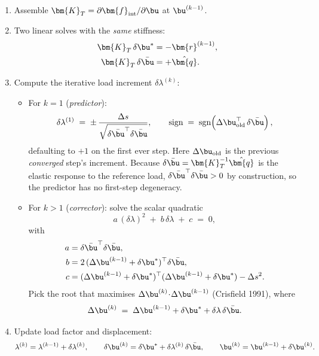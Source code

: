 \begin{enumerate}
\item Assemble $\bm{K}_T = \partial \bm{f}_{\rm int}/\partial \bu$ at $\bu^{(k-1)}$.

\item Two linear solves with the \emph{same} stiffness:
\begin{align}
\bm{K}_T\,\delta\bu^{*} &= -\bm{r}^{(k-1)}, \\
\bm{K}_T\,\delta\bar{\bu} &= +\hat{\bm{q}}.
\end{align}

\item Compute the iterative load increment $\delta\lambda^{(k)}$:
\begin{itemize}
\item For $k=1$ (\emph{predictor}):
\begin{equation}
\delta\lambda^{(1)} \;=\; \pm\,\frac{\Delta s}{\sqrt{\delta\bar{\bu}^{\top}\delta\bar{\bu}}},
\qquad
\text{sign} \;=\; \mathrm{sgn}\!\left(\Delta\bu_{\rm old}^{\top}\,\delta\bar{\bu}\right),
\end{equation}
defaulting to $+1$ on the first ever step. Here $\Delta\bu_{\rm old}$
is the previous \emph{converged} step's increment. Because
$\delta\bar{\bu} = \bm{K}_T^{-1}\hat{\bm{q}}$ is the elastic response to
the reference load, $\delta\bar{\bu}^{\top}\delta\bar{\bu} > 0$ by
construction, so the predictor has no first-step degeneracy.

\item For $k>1$ (\emph{corrector}): solve the scalar quadratic
\begin{equation}
a\,(\delta\lambda)^2 \;+\; b\,\delta\lambda \;+\; c \;=\; 0,
\end{equation}
with
\begin{align}
a &= \delta\bar{\bu}^{\top}\delta\bar{\bu}, \\
b &= 2\,(\Delta\bu^{(k-1)} + \delta\bu^{*})^{\top}\delta\bar{\bu}, \\
c &= (\Delta\bu^{(k-1)} + \delta\bu^{*})^{\top}(\Delta\bu^{(k-1)} + \delta\bu^{*}) - \Delta s^2.
\end{align}
Pick the root that maximises $\Delta\bu^{(k)}\!\cdot\!\Delta\bu^{(k-1)}$
(Crisfield 1991), where
\begin{equation}
\Delta\bu^{(k)} \;=\; \Delta\bu^{(k-1)} + \delta\bu^{*} + \delta\lambda\,\delta\bar{\bu}.
\end{equation}
\end{itemize}

\item Update load factor and displacement:
\begin{equation}
\lambda^{(k)} = \lambda^{(k-1)} + \delta\lambda^{(k)},
\qquad
\delta\bu^{(k)} = \delta\bu^{*} + \delta\lambda^{(k)}\,\delta\bar{\bu},
\qquad
\bu^{(k)} = \bu^{(k-1)} + \delta\bu^{(k)}.
\end{equation}


\end{enumerate}
